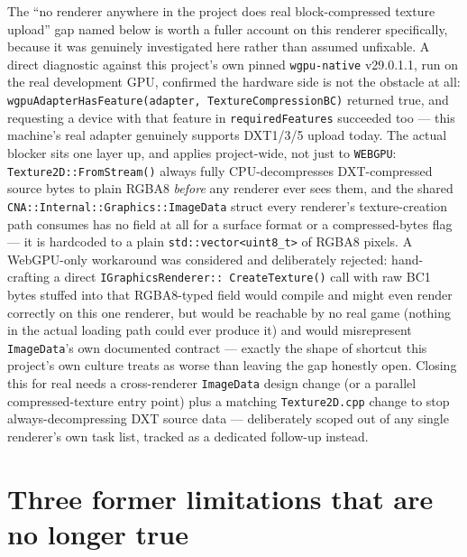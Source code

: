 The ``no renderer anywhere in the project does real block-compressed texture upload'' gap named
below is worth a fuller account on this renderer specifically, because it was genuinely
investigated here rather than assumed unfixable. A direct diagnostic against this project's own
pinned \texttt{wgpu-native} v29.0.1.1, run on the real development GPU, confirmed the hardware
side is not the obstacle at all: \texttt{wgpuAdapterHasFeature(adapter,
TextureCompressionBC)} returned true, and requesting a device with that feature in
\texttt{requiredFeatures} succeeded too --- this machine's real adapter genuinely supports
DXT1/3/5 upload today. The actual blocker sits one layer up, and applies project-wide, not just
to \texttt{WEBGPU}: \texttt{Texture2D::FromStream()} always fully CPU-decompresses DXT-compressed
source bytes to plain RGBA8 \emph{before} any renderer ever sees them, and the shared
\texttt{CNA::Internal::Graphics::ImageData} struct every renderer's texture-creation path
consumes has no field at all for a surface format or a compressed-bytes flag --- it is
hardcoded to a plain \texttt{std::vector<uint8\_t>} of RGBA8 pixels. A WebGPU-only workaround
was considered and deliberately rejected: hand-crafting a direct \texttt{IGraphicsRenderer::%
CreateTexture()} call with raw BC1 bytes stuffed into that RGBA8-typed field would compile and
might even render correctly on this one renderer, but would be reachable by no real game (nothing
in the actual  loading path could ever produce it) and would misrepresent
\texttt{ImageData}'s own documented contract --- exactly the shape of shortcut this project's
own culture treats as worse than leaving the gap honestly open. Closing this for real needs a
cross-renderer \texttt{ImageData} design change (or a parallel compressed-texture entry point)
plus a matching \texttt{Texture2D.cpp} change to stop always-decompressing DXT source data ---
deliberately scoped out of any single renderer's own task list, tracked as a dedicated follow-up
instead.

\section{Three former limitations that are no longer true}

